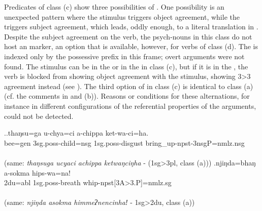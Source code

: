 Predicates of class (c) show three possibilities of . One possibility is an unexpected pattern where the stimulus triggers object agreement, while the  triggers subject agreement, which leads, oddly enough, to  a literal translation  in \Next[a]. Despite the subject agreement on the verb, the  psych-nouns in this class do not host an   marker,  an option that is available, however, for verbs of class (d). The  is indexed only  by the possessive prefix in this frame; overt  arguments were not found. The stimulus can be in the  or in the  in class (c), but if it is in the , the verb is blocked from showing object agreement with the stimulus, showing 3>3 agreement instead (see \Next[b]). The third option of  in class (c) is identical to class (a) (cf. the comments in \Next[a] and (b)). Reasons or conditions for these alternations, for instance  in different  configurations of the referential properties of the arguments, could not be detected. 

\ex.\ag.thaŋsu=ga u-chya=ci a-chippa ket-wa-ci=ha.\\
bee{\sc =gen} {\sc 3sg.poss-}child{\sc =nsg} {\sc 1sg.poss-}disgust bring\_up{\sc -npst-3nsgP=nmlz.nsg}\\
 \\
(same: \emph{thaŋsuga ucyaci achippa ketwaŋciŋha} - (1{\sc sg}>3{\sc pl}, class (a)))
\bg.njiŋda=bhaŋ a-sokma hips-wa=na!\\
{\sc 2du=abl} {\sc 1sg.poss-}breath whip-{\sc npst[3A>3.P]=nmlz.sg}\\
 \\
(same: \emph{njiŋda asokma himmeʔnencinhaǃ} - 1{\sc sg}>2{\sc du}, class (a))


